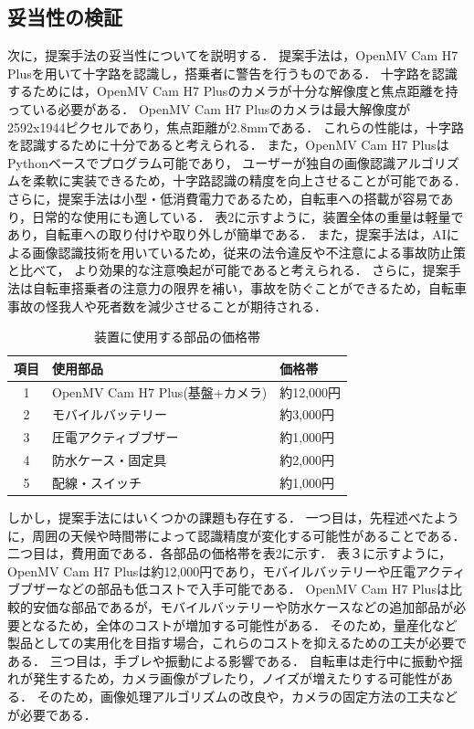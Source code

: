 \documentclass[uplatex,dvipdfmx]{jsarticle}
\begin{document}
\subsection{妥当性の検証}
\indent
次に，提案手法の妥当性についてを説明する．
提案手法は，OpenMV Cam H7 Plusを用いて十字路を認識し，搭乗者に警告を行うものである．
十字路を認識するためには，OpenMV Cam H7 Plusのカメラが十分な解像度と焦点距離を持っている必要がある．
OpenMV Cam H7 Plusのカメラは最大解像度が2592x1944ピクセルであり，焦点距離が2.8mmである．
これらの性能は，十字路を認識するために十分であると考えられる．
また，OpenMV Cam H7 PlusはPythonベースでプログラム可能であり，
ユーザーが独自の画像認識アルゴリズムを柔軟に実装できるため，十字路認識の精度を向上させることが可能である．
さらに，提案手法は小型・低消費電力であるため，自転車への搭載が容易であり，日常的な使用にも適している．
表2に示すように，装置全体の重量は軽量であり，自転車への取り付けや取り外しが簡単である．
また，提案手法は，AIによる画像認識技術を用いているため，従来の法令違反や不注意による事故防止策と比べて，
より効果的な注意喚起が可能であると考えられる．
さらに，提案手法は自転車搭乗者の注意力の限界を補い，事故を防ぐことができるため，自転車事故の怪我人や死者数を減少させることが期待される．
\par

\begin{table}[h]
  \centering
  \caption{装置に使用する部品の価格帯}
  \label{tab:parts}
  \begin{tabular}{|c|l|l|}
    \hline
    項目 & 使用部品 & 価格帯\\ \hline
    1 & OpenMV Cam H7 Plus(基盤+カメラ) & 約12,000円\\ \hline
    2 & モバイルバッテリー & 約3,000円\\ \hline
    3 & 圧電アクティブブザー & 約1,000円\\ \hline
    4 & 防水ケース・固定具 & 約2,000円\\ \hline
    5 & 配線・スイッチ & 約1,000円\\ \hline
  \end{tabular}
\end{table}

しかし，提案手法にはいくつかの課題も存在する．
一つ目は，先程述べたように，周囲の天候や時間帯によって認識精度が変化する可能性があることである．
二つ目は，費用面である．各部品の価格帯を表2に示す．
表３に示すように，OpenMV Cam H7 Plusは約12,000円であり，モバイルバッテリーや圧電アクティブブザーなどの部品も低コストで入手可能である．
OpenMV Cam H7 Plusは比較的安価な部品であるが，モバイルバッテリーや防水ケースなどの追加部品が必要となるため，全体のコストが増加する可能性がある．
そのため，量産化など製品としての実用化を目指す場合，これらのコストを抑えるための工夫が必要である．
三つ目は，手ブレや振動による影響である．
自転車は走行中に振動や揺れが発生するため，カメラ画像がブレたり，ノイズが増えたりする可能性がある．
そのため，画像処理アルゴリズムの改良や，カメラの固定方法の工夫などが必要である．
\par
\end{document}
